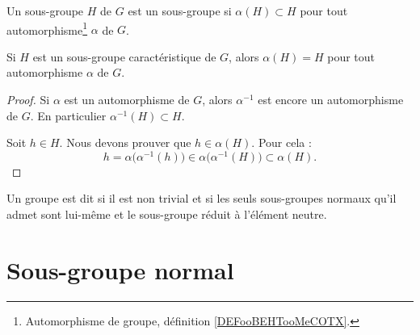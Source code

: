 \begin{definition}      \label{DEFooUXXTooCCLmQe}
	Un sous-groupe \( H\) de \( G\) est un sous-groupe  si \( \alpha(H)\subset H\) pour tout automorphisme\footnote{Automorphisme de groupe, définition \ref{DEFooBEHTooMeCOTX}.} \( \alpha\) de \( G\).
\end{definition}

\begin{lemma}
	Si \( H\) est un sous-groupe caractéristique de \( G\), alors \( \alpha(H)=H\) pour tout automorphisme \( \alpha\) de \( G\).
\end{lemma}

\begin{proof}
	Si \( \alpha\) est un automorphisme de \( G\), alors \( \alpha^{-1}\) est encore un automorphisme de \( G\). En particulier \( \alpha^{-1}(H)\subset H\).

	Soit \( h\in H\). Nous devons prouver que \( h\in \alpha(H)\). Pour cela :
	\begin{equation}
		h=\alpha\big( \alpha^{-1}(h) \big)\in \alpha\big( \alpha^{-1}(H) \big)\subset\alpha(H).
	\end{equation}
\end{proof}

\begin{definition}                 \label{DefGroupeSimple}
	Un groupe est dit  si il est non trivial et si les seuls sous-groupes normaux qu'il admet sont lui-même et le sous-groupe réduit à l'élément neutre.
\end{definition}

\section{Sous-groupe normal}

